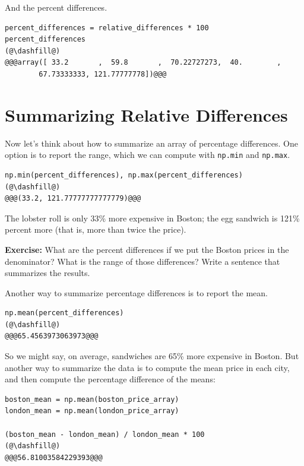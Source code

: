 And the percent differences.

\begin{lstlisting}[]
percent_differences = relative_differences * 100
percent_differences
(@\dashfill@)
@@@array([ 33.2       ,  59.8       ,  70.22727273,  40.        ,
        67.73333333, 121.77777778])@@@
\end{lstlisting}

\hypertarget{summarizing-relative-differences}{%
\section{Summarizing Relative
Differences}\label{summarizing-relative-differences}}

Now let's think about how to summarize an array of percentage
differences. One option is to report the range, which we can compute
with \passthrough{\lstinline!np.min!} and
\passthrough{\lstinline!np.max!}.

\begin{lstlisting}[]
np.min(percent_differences), np.max(percent_differences)
(@\dashfill@)
@@@(33.2, 121.77777777777779)@@@
\end{lstlisting}

The lobster roll is only 33\% more expensive in Boston; the egg sandwich
is 121\% percent more (that is, more than twice the price).

\textbf{Exercise:} What are the percent differences if we put the Boston
prices in the denominator? What is the range of those differences? Write
a sentence that summarizes the results.

Another way to summarize percentage differences is to report the mean.

\begin{lstlisting}[]
np.mean(percent_differences)
(@\dashfill@)
@@@65.4563973063973@@@
\end{lstlisting}

So we might say, on average, sandwiches are 65\% more expensive in
Boston. But another way to summarize the data is to compute the mean
price in each city, and then compute the percentage difference of the
means:

\begin{lstlisting}[]
boston_mean = np.mean(boston_price_array)
london_mean = np.mean(london_price_array)

(boston_mean - london_mean) / london_mean * 100
(@\dashfill@)
@@@56.81003584229393@@@
\end{lstlisting}

